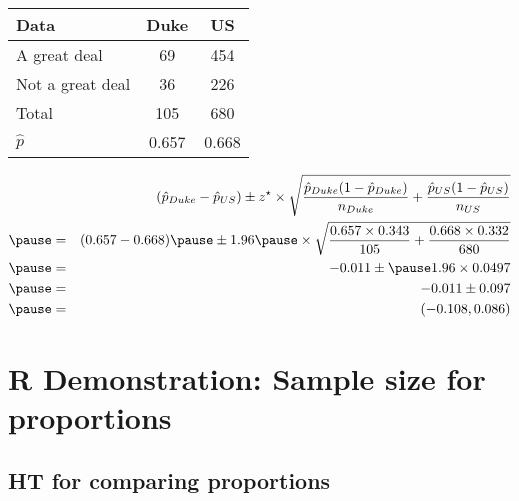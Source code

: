\documentclass[slidestop,compress,mathserif]{beamer}
\newcommand{\soln}[1]{\textit{#1}}
\begin{document}
\begin{frame}
\frametitle{}


{\footnotesize
\begin{center}
\begin{tabular}{l | c c}
Data			& Duke		& US \\
\hline
A great deal	& 69			& 454 \\
Not a great deal& 36			& 226 \\
\hline
Total			& 105		& 680 \\
\hline
\pause
$\hat{p}$		& 0.657		& 0.668
\end{tabular}
\end{center}
}

\pause

\soln{
\begin{eqnarray*}
&& (\hat{p}_{Duke} - \hat{p}_{US}) \pm z^\star \times \sqrt{ \frac{ \hat{p}_{Duke} (1 - \hat{p}_{Duke})}{n_{Duke} } + \frac{ \hat{p}_{US} (1 -  \hat{p}_{US})}{n_{US} } }  \\
\pause
&=& (0.657 - 0.668) \pause \pm 1.96 \pause \times \sqrt{ \frac{0.657 \times 0.343}{105} + \frac{0.668 \times 0.332}{680} } \\
\pause
&=& -0.011 \pm \pause 1.96 \times 0.0497 \\
\pause
&=& -0.011 \pm 0.097 \\
\pause
&=& (-0.108, 0.086)
\end{eqnarray*}
}


\end{frame}

\section{R Demonstration: Sample size for proportions}



\subsection{HT for comparing proportions}

\end{document}

